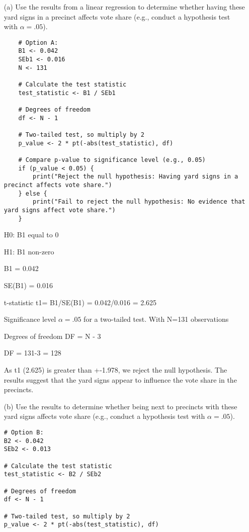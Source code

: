 \documentclass[12pt,letterpaper]{article}
\begin{document}
	\newpage
\vspace{.5cm}
\begin{enumerate}
	\item [(a)] Use the results from a linear regression to determine whether having these yard signs in a precinct affects vote share (e.g., conduct a hypothesis test with $\alpha = .05$).
	
	\begin{lstlisting}
	# Option A:
	B1 <- 0.042
	SEb1 <- 0.016
	N <- 131
	
	# Calculate the test statistic
	test_statistic <- B1 / SEb1
	
	# Degrees of freedom
	df <- N - 1
	
	# Two-tailed test, so multiply by 2
	p_value <- 2 * pt(-abs(test_statistic), df)
	
	# Compare p-value to significance level (e.g., 0.05)
	if (p_value < 0.05) {
		print("Reject the null hypothesis: Having yard signs in a precinct affects vote share.")
	} else {
		print("Fail to reject the null hypothesis: No evidence that yard signs affect vote share.")
	}
	\end{lstlisting}
	
	H0: B1 equal to 0
	
	H1: B1 non-zero
	
	B1 = 0.042
	
	SE(B1) = 0.016
	
	t-statistic
	t1= B1/SE(B1) = 0.042/0.016 = 2.625
	
	Significance level  $\alpha = .05$ for a two-tailed test. With N=131 observations
	
	Degrees of freedom DF = N - 3
	
	DF = 131-3 = 128
	
	As t1 (2.625) is greater than +-1.978, we reject the null hypothesis. The results suggest that
	the yard signs appear to influence the vote share in the precincts. 
	
	\newpage		
	\item [(b)]  Use the results to determine whether being
	next to precincts with these yard signs affects vote
	share (e.g., conduct a hypothesis test with $\alpha = .05$).

\begin{lstlisting}
# Option B:
B2 <- 0.042
SEb2 <- 0.013

# Calculate the test statistic
test_statistic <- B2 / SEb2

# Degrees of freedom
df <- N - 1

# Two-tailed test, so multiply by 2
p_value <- 2 * pt(-abs(test_statistic), df)


\end{lstlisting}
\end{enumerate}
\end{document}
